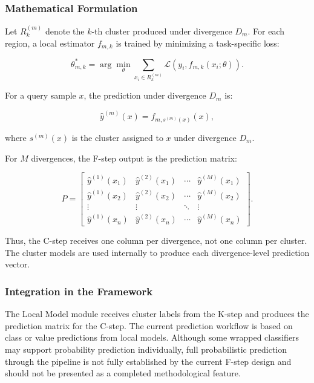 \subsubsection*{Mathematical Formulation}

Let $R_k^{(m)}$ denote the $k$-th cluster produced under divergence $D_m$. For each region, a local estimator $f_{m,k}$ is trained by minimizing a task-specific loss:

\[
    \theta_{m,k}^{*}
    =
    \arg\min_{\theta}
    \sum_{x_i \in R_k^{(m)}}
    \mathcal{L}\left(y_i, f_{m,k}(x_i;\theta)\right).
\]

For a query sample $x$, the prediction under divergence $D_m$ is:

\[
    \hat{y}^{(m)}(x)
    =
    f_{m,s^{(m)}(x)}(x),
\]

where $s^{(m)}(x)$ is the cluster assigned to $x$ under divergence $D_m$.

For $M$ divergences, the F-step output is the prediction matrix:

\[
    P =
    \begin{bmatrix}
        \hat{y}^{(1)}(x_1) & \hat{y}^{(2)}(x_1) & \cdots & \hat{y}^{(M)}(x_1) \\
        \hat{y}^{(1)}(x_2) & \hat{y}^{(2)}(x_2) & \cdots & \hat{y}^{(M)}(x_2) \\
        \vdots             & \vdots             & \ddots & \vdots             \\
        \hat{y}^{(1)}(x_n) & \hat{y}^{(2)}(x_n) & \cdots & \hat{y}^{(M)}(x_n)
    \end{bmatrix}.
\]

Thus, the C-step receives one column per divergence, not one column per cluster. The cluster models are used internally to produce each divergence-level prediction vector.

\subsubsection*{Integration in the Framework}

The Local Model module receives cluster labels from the K-step and produces the prediction matrix for the C-step. The current \KFCProcedure{} prediction workflow is based on class or value predictions from local models. Although some wrapped classifiers may support probability prediction individually, full probabilistic prediction through the \KFCProcedure{} pipeline is not fully established by the current F-step design and should not be presented as a completed methodological feature.

